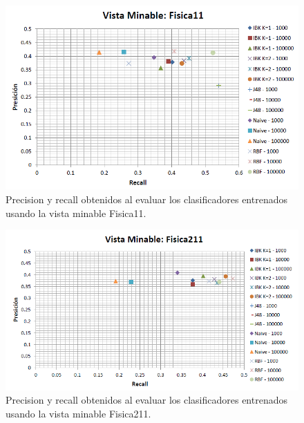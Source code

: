 \documentclass{article}
\begin{document}
\begin{figure}[!htb]
\begin{centering}
\includegraphics[scale=0.8]{fisica11}
\par\end{centering}
\caption{Precision y recall obtenidos al evaluar los clasificadores entrenados usando la vista minable Fisica11.}
\label{fig:figura4}
\end{figure}

\begin{figure}[!htb]
\begin{centering}
\includegraphics[scale=0.8]{fisica211}
\par\end{centering}
\caption{Precision y recall obtenidos al evaluar los clasificadores entrenados usando la vista minable Fisica211.}
\label{fig:figura5}
\end{figure}
\end{document}
